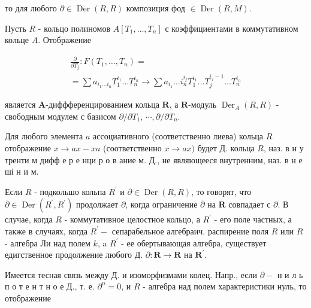 \documentclass[10pt]{article}
\begin{document}
то для любого $\partial \in \operatorname{Der}(R, R)$ композиция фод $\in \operatorname{Der}(R, M)$.



Пусть $R$ - кольцо полиномов $A\left[T_{1}, \ldots, T_{n}\right]$ с коэффициентами в коммутативном кольце $A$. Отображение



\[

\begin{gathered}

\frac{\partial}{\partial T_{j}}: F\left(T_{1}, \ldots, T_{n}\right)= \\

=\sum a_{i_{1} \ldots i_{n}} T_{1}^{i_{1}} \ldots T_{n}^{i_{n}} \longrightarrow \sum a_{i_{1}} \ldots i_{n}^{i_{j}} T_{1}^{i_{1}} \ldots T_{j}^{i_{j}-1} \ldots T_{n}^{i_{n}}

\end{gathered}

\]



является $\boldsymbol{A}$-диффференцированием кольца $\boldsymbol{R}$, а $\boldsymbol{R}$-модуль $\operatorname{Der}_{A}(R, R)$ - свободным модулем с базисом $\partial / \partial T_{1}$, $\cdots, \partial / \partial T_{n}$.



Для любого элемента $a$ ассоциативного (соответственно лиева) кольца $R$ отображение $x \rightarrow a x-x a$ (соответственно $x \rightarrow a x)$ будет Д. кольца $R$, наз. в н у тренти м дифф е р е нци р о в ание м. Д., не являющееся внутренним, наз. в н е ші н и м.



Если $R$ - подкольшо кольпа $R^{\prime}$ и $\partial \in \operatorname{Der}(R, R)$, то говорят, что $\bar{\partial} \in \operatorname{Der}\left(R^{\prime}, R^{\prime}\right)$ продолжает $\partial$, когда ограничение $\bar{\partial}$ на $\boldsymbol{R}$ совпадает с $\partial$. В случае, когда $R$ - коммутативное целостное кольцо, а $R^{\prime}$ - его поле частных, а также в случаях, когда $R^{\prime}-$ сепарабельное алгебраич. распирение поля $R$ или $R$ - алгебра Ли над полем $k$, a $R^{\prime}$ - ее обертывающая алгебра, существует едигственное продолжение любого Д. $\partial: \boldsymbol{R} \rightarrow \boldsymbol{R}$ на $\boldsymbol{R}^{\prime}$.



Имеется тесная связь между Д. и изоморфизмами колец. Напр., если $\partial-$ н и л ь п о т е н т н о е Д., т. е. $\partial^{n}=0$, и $R$ - алгебра над полем характеристики нуль, то отображение
\end{document}
